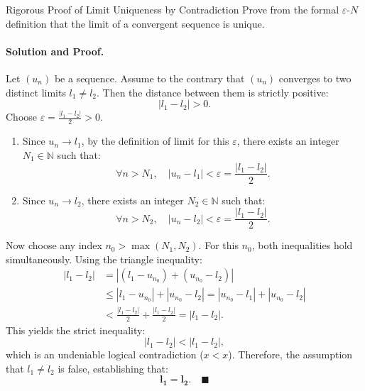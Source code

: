 \begin{workedexample}{Rigorous Proof of Limit Uniqueness by Contradiction}
Prove from the formal $\varepsilon$-$N$ definition that the limit of a convergent sequence is unique.

\paragraph{Solution and Proof.}
Let $(u_n)$ be a sequence. Assume to the contrary that $(u_n)$ converges to two distinct limits $l_1 \neq l_2$.
Then the distance between them is strictly positive:
\[
|l_1 - l_2| > 0.
\]
Choose $\varepsilon = \frac{|l_1 - l_2|}{2} > 0$.
\begin{enumerate}[leftmargin=1.4em,itemsep=3pt]
  \item Since $u_n \to l_1$, by the definition of limit for this $\varepsilon$, there exists an integer $N_1 \in \mathbb{N}$ such that:
  \[
  \forall n > N_1, \quad |u_n - l_1| < \varepsilon = \frac{|l_1 - l_2|}{2}.
  \]
  \item Since $u_n \to l_2$, there exists an integer $N_2 \in \mathbb{N}$ such that:
  \[
  \forall n > N_2, \quad |u_n - l_2| < \varepsilon = \frac{|l_1 - l_2|}{2}.
  \]
\end{enumerate}
Now choose any index $n_0 > \max(N_1, N_2)$.
For this $n_0$, both inequalities hold simultaneously.
Using the triangle inequality:
\begin{align*}
|l_1 - l_2| &= |(l_1 - u_{n_0}) + (u_{n_0} - l_2)| \\
            &\le |l_1 - u_{n_0}| + |u_{n_0} - l_2| = |u_{n_0} - l_1| + |u_{n_0} - l_2| \\
            &< \frac{|l_1 - l_2|}{2} + \frac{|l_1 - l_2|}{2} = |l_1 - l_2|.
\end{align*}
This yields the strict inequality:
\[
|l_1 - l_2| < |l_1 - l_2|,
\]
which is an undeniable logical contradiction ($x < x$).
Therefore, the assumption that $l_1 \neq l_2$ is false, establishing that:
\[
\mathbf{l_1 = l_2}. \quad \blacksquare
\]
\end{workedexample}

